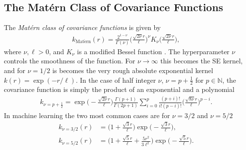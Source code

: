 \documentclass[twoside,english]{uiofysmaster}
\begin{document}

\subsection{The Mat\'{e}rn Class of Covariance Functions}\label{Sec:: gaussian process : Matern Class of Covariance Functions}

The \textit{Mat\'{e}rn class of covariance functions} is given by
\begin{align}\label{Eq:: gaussian process : Matern class of covariance functions}
k_{\mathrm{Mat\acute{e}rn}} (r) = \frac{2^{1- \nu}}{\Gamma (\nu)} \Big( \frac{\sqrt{2 \nu} r	}{\ell} \Big)^{\nu} K_{\nu} \Big( \frac{\sqrt{2 \nu}r}{\ell} \Big),
\end{align}
where $\nu, \ell > 0$, and $K_{\nu}$ is a modified Bessel function \cite{abramowitz1964handbook}. The hyperparameter $\nu$ controls the smoothness of the function. For $\nu \rightarrow \infty$ this becomes the SE kernel, and for $\nu = 1/2$ is becomes the very rough absolute exponential kernel $k(r) = \exp (-r/\ell)$. In the case of half integer $\nu$, $\nu = p + \frac{1}{2}$ for $p \in \mathbb{N}$, the covariance function is simply the product of an exponential and a polynomial
\begin{align}
k_{\nu=p+\frac{1}{2}} = \exp \Big(- \frac{\sqrt{2 \nu} r	}{\ell} \Big) \frac{\Gamma(p+1)}{\Gamma(2p + 1)} \sum^p_{i=0} \frac{(p+i)!}{i!(p-i)!} \Big( \frac{\sqrt{8 \nu} r	}{\ell} \Big)^{p-i}.
\end{align}
In machine learning the two most common cases are for $\nu = 3/2$ and $\nu = 5/2$
\begin{align}
k_{\nu = 3/2}(r) &=  \Big(1 + \frac{\sqrt{3}r}{\ell} \Big) \exp \Big( -\frac{\sqrt{3}r}{\ell} \Big),\\
k_{\nu = 5/2}(r) &=  \Big(1 + \frac{\sqrt{5}r}{\ell}  + \frac{5r^2}{3 \ell^2}\Big) \exp \Big( -\frac{\sqrt{5}r}{\ell} \Big).
\end{align}

\end{document}
